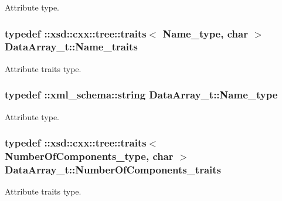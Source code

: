 Attribute type. 

\hypertarget{classDataArray__t_a46d0b4cf44ee9122e4cbb3bd3abe6663}{}
\subsubsection[{Name\+\_\+traits}]{\setlength{\rightskip}{0pt plus 5cm}typedef \+::xsd\+::cxx\+::tree\+::traits$<$ {\bf Name\+\_\+type}, char $>$ {\bf Data\+Array\+\_\+t\+::\+Name\+\_\+traits}}\label{classDataArray__t_a46d0b4cf44ee9122e4cbb3bd3abe6663}


Attribute traits type. 

\hypertarget{classDataArray__t_afc6836923916c2489f91caea78ec4ad6}{}
\subsubsection[{Name\+\_\+type}]{\setlength{\rightskip}{0pt plus 5cm}typedef \+::{\bf xml\+\_\+schema\+::string} {\bf Data\+Array\+\_\+t\+::\+Name\+\_\+type}}\label{classDataArray__t_afc6836923916c2489f91caea78ec4ad6}


Attribute type. 

\hypertarget{classDataArray__t_a1112148f87db2c0ba05323377d9f0427}{}
\subsubsection[{Number\+Of\+Components\+\_\+traits}]{\setlength{\rightskip}{0pt plus 5cm}typedef \+::xsd\+::cxx\+::tree\+::traits$<$ {\bf Number\+Of\+Components\+\_\+type}, char $>$ {\bf Data\+Array\+\_\+t\+::\+Number\+Of\+Components\+\_\+traits}}\label{classDataArray__t_a1112148f87db2c0ba05323377d9f0427}


Attribute traits type. 

\hypertarget{classDataArray__t_aac602cec132f6e771f7fa3be1d19c16f}{}
